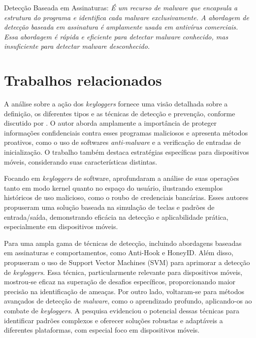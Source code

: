 \documentclass[12pt]{article}
\begin{document}
Detecção Baseada em Assinaturas: \textit{É um recurso de malware que encapsula a estrutura do programa e identifica cada malware exclusivamente. A abordagem de detecção baseada em assinatura é amplamente usada em antivírus comerciais. Essa abordagem é rápida e eficiente para detectar malware conhecido, mas insuficiente para detectar malware desconhecido.} \citep{aslan2020comprehensive}

\section{Trabalhos relacionados}

A análise sobre a ação dos \textit{keyloggers} fornece uma visão detalhada sobre a definição, os diferentes tipos e as técnicas de detecção e prevenção, conforme discutido por \citep{singh2021keylogger}. O autor aborda amplamente a importância de proteger informações confidenciais contra esses programas maliciosos e apresenta métodos proativos, como o uso de softwares \textit{anti-malware} e a verificação de entradas de inicialização. O trabalho também destaca estratégias específicas para dispositivos móveis, considerando suas características distintas.

Focando em \textit{keyloggers} de software, \citep{wajahat2019novel} aprofundaram a análise de suas operações tanto em modo kernel quanto no espaço do usuário, ilustrando exemplos históricos de uso malicioso, como o roubo de credenciais bancárias. Esses autores propuseram uma solução baseada na simulação de teclas e padrões de entrada/saída, demonstrando eficácia na detecção e aplicabilidade prática, especialmente em dispositivos móveis.

Para \citep{solairaj2016keyloggers} uma ampla gama de técnicas de detecção, incluindo abordagens baseadas em assinaturas e comportamentos, como Anti-Hook e HoneyID. Além disso, propuseram o uso de Support Vector Machines (SVM) para aprimorar a detecção de \textit{keyloggers}. Essa técnica, particularmente relevante para dispositivos móveis, mostrou-se eficaz na superação de desafios específicos, proporcionando maior precisão na identificação de ameaças. Por outro lado, \citep{aslan2020comprehensive} voltaram-se para métodos avançados de detecção de \textit{malware}, como o aprendizado profundo, aplicando-os ao combate de \textit{keyloggers}. A pesquisa evidenciou o potencial dessas técnicas para identificar padrões complexos e oferecer soluções robustas e adaptáveis a diferentes plataformas, com especial foco em dispositivos móveis.
\end{document}
